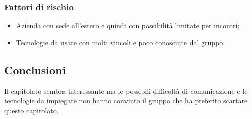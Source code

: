 \documentclass[../StudioDiFattibilita.tex]{subfiles}
\begin{document}
			\subsubsection{Fattori di rischio}
				\begin{itemize}
				\item Azienda con sede all'estero e quindi con possibilità limitate per incontri;
				\item Tecnologie da usare con molti vincoli e poco conosciute dal gruppo.
			\end{itemize}
			
			\subsection{Conclusioni}
			Il capitolato sembra interessante ma le possibili difficoltà di comunicazione e le tecnologie da impiegare non hanno convinto il gruppo \kaleidoscode che ha preferito scartare questo capitolato.
\end{document}
